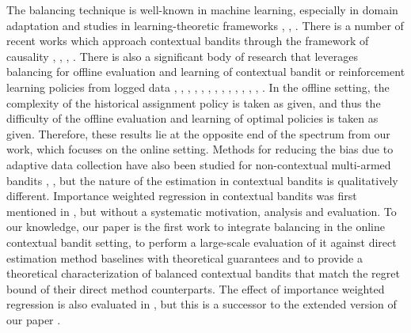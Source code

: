 \documentclass[letterpaper]{article} %
\begin{document}
The balancing technique is well-known in machine learning, especially in domain adaptation and  studies in learning-theoretic frameworks \cite{huang-ml}, \cite{zadrozny-ml}, \cite{cortes-ml}.
There is a number of recent works which approach contextual bandits through the framework of causality \cite{bareinboim-bandits}, \cite{bareinboim-fusion}, \cite{forney-fusion}, \cite{lattimore-causalbandit}. 
There is also a significant body of research that leverages balancing for offline evaluation and learning of contextual bandit or reinforcement learning policies from logged data \cite{strehl2010learning}, \cite{dudik-offline-1}, \cite{li-offline-1}, \cite{dudik-offline-2}, \cite{li-offline-2}, \cite{swaminathan-offline}, \cite{jiang-offline}, \cite{thomas-offline}, \cite{athey-offline}, \cite{kallus-offline}, \cite{wang-offline}, \cite{deshpande-offline}, \cite{kallus2018policy}, \cite{zhou2018offline}. 
In the offline setting, the complexity of the historical assignment policy is taken as given, and thus the difficulty of the offline evaluation and learning of optimal policies is taken as given. 
Therefore, these results lie at the opposite end of the spectrum from our work, which focuses on the online setting.
Methods for reducing the bias due to adaptive data collection have also been studied for non-contextual multi-armed bandits \cite{villar-online}, \cite{nie-online}, but the nature of the estimation in contextual bandits is qualitatively different. 
Importance weighted regression in contextual bandits was first mentioned in \cite{agarwal-ilovetoconbandits}, but without a systematic motivation, analysis and evaluation. To our knowledge, our paper is the first work to integrate balancing in the online contextual bandit setting, to perform a large-scale evaluation of it against direct estimation method baselines with theoretical guarantees and to provide a theoretical characterization of balanced contextual bandits that match the regret bound of their direct method counterparts. The effect of importance weighted regression is also evaluated in \cite{bietti2018contextual}, but this is a successor to the extended version of our paper \cite{dimakopoulou2017estimation}.
\end{document}

